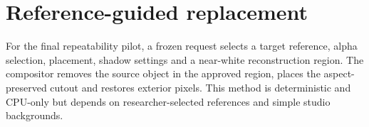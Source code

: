 \section{Reference-guided replacement}
For the final repeatability pilot, a frozen request selects a target reference, alpha selection, placement, shadow settings and a near-white reconstruction region. The compositor removes the source object in the approved region, places the aspect-preserved cutout and restores exterior pixels. This method is deterministic and CPU-only but depends on researcher-selected references and simple studio backgrounds.
